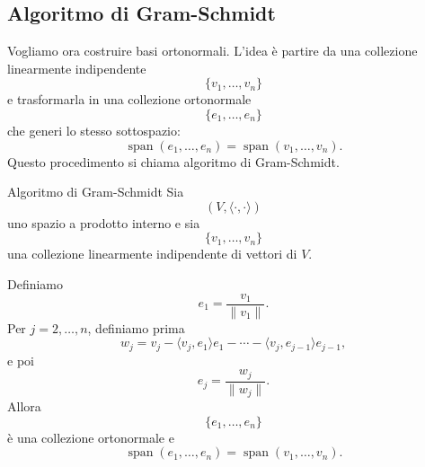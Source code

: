 \documentclass[a4paper]{article}
\begin{document}
\subsection{Algoritmo di Gram-Schmidt}

Vogliamo ora costruire basi ortonormali. L'idea è partire da una collezione linearmente indipendente
\[
    \{v_1,\ldots,v_n\}
\]
e trasformarla in una collezione ortonormale
\[
    \{e_1,\ldots,e_n\}
\]
che generi lo stesso sottospazio:
\[
    \operatorname{span}(e_1,\ldots,e_n)
    =
    \operatorname{span}(v_1,\ldots,v_n).
\]
Questo procedimento si chiama algoritmo di Gram-Schmidt.

\begin{snippettheorem}{Algoritmo di Gram-Schmidt}
    Sia
    \[
        (V,\langle\cdot,\cdot\rangle)
    \]
    uno spazio a prodotto interno e sia
    \[
        \{v_1,\ldots,v_n\}
    \]
    una collezione linearmente indipendente di vettori di \(V\).

    Definiamo
    \[
        e_1=\frac{v_1}{\|v_1\|}.
    \]
    Per \(j=2,\ldots,n\), definiamo prima
    \[
        w_j
        =
        v_j
        -
        \langle v_j,e_1\rangle e_1
        -\cdots-
        \langle v_j,e_{j-1}\rangle e_{j-1},
    \]
    e poi
    \[
        e_j=\frac{w_j}{\|w_j\|}.
    \]
    Allora
    \[
        \{e_1,\ldots,e_n\}
    \]
    è una collezione ortonormale e
    \[
        \operatorname{span}(e_1,\ldots,e_n)
        =
        \operatorname{span}(v_1,\ldots,v_n).
    \]
\end{snippettheorem}

\begin{center}
\end{center}
\end{document}
